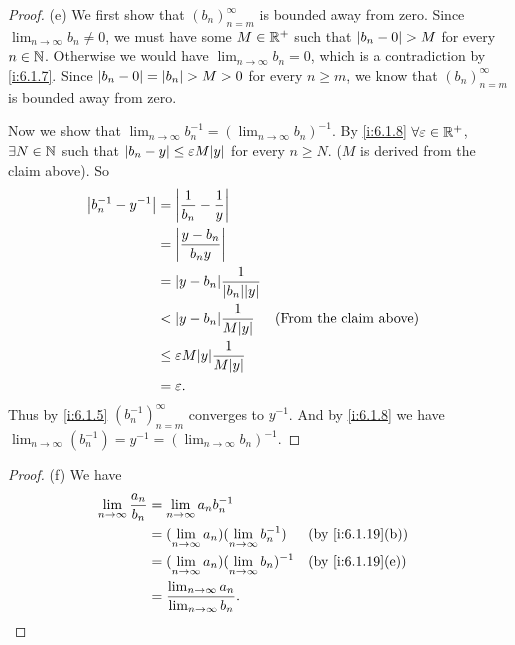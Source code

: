 \begin{proof}{(e)}
  We first show that \((b_n)_{n = m}^\infty\) is bounded away from zero.
  Since \(\lim_{n \to \infty} b_n \neq 0\), we must have some \(M \in \mathbb{R}^+\) such that \(\left\lvert b_n - 0\right\rvert > M\) for every \(n \in \mathbb{N}\).
  Otherwise we would have \(\lim_{n \to \infty} b_n = 0\), which is a contradiction by \cref{i:6.1.7}.
  Since \(\left\lvert b_n - 0\right\rvert = \left\lvert b_n\right\rvert > M > 0\) for every \(n \geq m\), we know that \((b_n)_{n = m}^\infty\) is bounded away from zero.

  Now we show that \(\lim_{n \to \infty} b_n^{-1} = (\lim_{n \to \infty} b_n)^{-1}\).
  By \cref{i:6.1.8} \(\forall \varepsilon \in \mathbb{R}^+\), \(\exists N \in \mathbb{N}\) such that \(\abs{b_n - y} \leq \varepsilon M \abs{y}\) for every \(n \geq N\).
  (\(M\) is derived from the claim above).
  So
  \begin{align*}
    \abs{b_n^{-1} - y^{-1}} & = \abs{\dfrac{1}{b_n} - \dfrac{1}{y}}                                           \\
                            & = \abs{\dfrac{y - b_n}{b_n y}}                                                  \\
                            & = \abs{y - b_n}\dfrac{1}{\abs{b_n}\abs{y}}                                      \\
                            & < \abs{y - b_n}\dfrac{1}{M\abs{y}}           &  & \text{(From the claim above)} \\
                            & \leq \varepsilon M\abs{y}\dfrac{1}{M\abs{y}}                                    \\
                            & = \varepsilon.
  \end{align*}
  Thus by \cref{i:6.1.5} \((b_n^{-1})_{n = m}^\infty\) converges to \(y^{-1}\).
  And by \cref{i:6.1.8} we have \(\lim_{n \to \infty} (b_n^{-1}) = y^{-1} = (\lim_{n \to \infty} b_n)^{-1}\).
\end{proof}

\begin{proof}{(f)}
  We have
  \begin{align*}
    \lim_{n \to \infty} \dfrac{a_n}{b_n} & = \lim_{n \to \infty} a_n b_n^{-1}                                                \\
                                         & = (\lim_{n \to \infty} a_n)(\lim_{n \to \infty} b_n^{-1})   &  & \by{i:6.1.19}[b] \\
                                         & = (\lim_{n \to \infty} a_n)(\lim_{n \to \infty} b_n)^{-1}   &  & \by{i:6.1.19}[e] \\
                                         & = \dfrac{\lim_{n \to \infty} a_n}{\lim_{n \to \infty} b_n}.
  \end{align*}
\end{proof}

